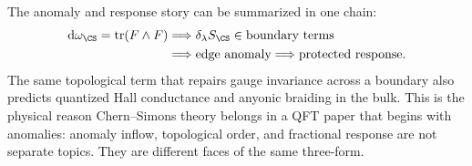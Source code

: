 The anomaly and response story can be summarized in one chain:
\[
\begin{aligned}
  \dd\omega_{\CS}=\tr(F\wedge F)
  &\Longrightarrow
  \delta_\lambda S_{\CS}\in\text{boundary terms}
  \\
  &\Longrightarrow
  \text{edge anomaly}
  \Longrightarrow
  \text{protected response}.
\end{aligned}
\]
The same topological term that repairs gauge invariance across a boundary also predicts quantized Hall conductance and anyonic braiding in the bulk. This is the physical reason Chern--Simons theory belongs in a QFT paper that begins with anomalies: anomaly inflow, topological order, and fractional response are not separate topics. They are different faces of the same three-form.
